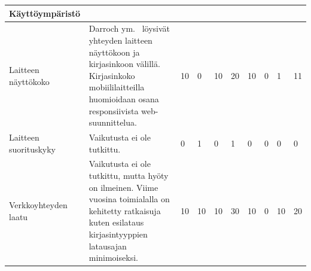\documentclass[finnish, 12pt, a4paper, elec, utf8, a-1b]{aaltothesis}
\begin{document}
{\begin{longtable}{p{2.5cm}|p{6cm}|p{0.5cm}p{0.5cm}p{0.5cm}|p{0.5cm}|p{0.5cm}p{0.5cm}p{0.5cm}|p{0.5cm}|}
    \midrule
    \textbf{Käyttöympäristö}                                                                                                                                                                                                                                                                                                                                                                                                                                                                                                                                                                                                                   \\
    \midrule
    Laitteen näyttökoko                    & Darroch ym.~\cite{10.1007/11555261_23} löysivät yhteyden laitteen näyttökoon ja kirjasinkoon välillä. Kirjasinkoko mobiililaitteilla huomioidaan osana responsiivista web-suunnittelua.                                                                       & 10                                         & 0                                   & 10                                     & 20                           & 10                                              & 0                                         & 1                                         & 11                           \\
    \midrule
    Laitteen suorituskyky                  & Vaikutusta ei ole tutkittu.                                                                                                                                                                                                                                   & 0                                          & 1                                   & 0                                      & 1                            & 0                                               & 0                                         & 0                                         & 0                            \\
    \midrule
    Verkkoyhteyden laatu                   & Vaikutusta ei ole tutkittu, mutta hyöty on ilmeinen. Viime vuosina toimialalla on kehitetty ratkaisuja kuten esilataus~\cite{grigorik_2020} kirjasintyyppien latausajan minimoiseksi.                                                                         & 10                                         & 10                                  & 10                                     & 30                           & 10                                              & 0                                         & 10                                        & 20                           \\

\end{longtable}}
\end{document}
